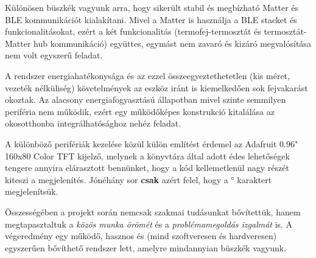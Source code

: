 \documentclass[12pt,a4paper]{article}
\begin{document}
Különösen büszkék vagyunk arra, hogy sikerült stabil és megbízható Matter és BLE kommunikációt kialakítani.
Mivel a Matter is használja a BLE stacket és funkcionalitásokat, ezért a két funkcionalitás (termofej-termosztát és termosztát-Matter hub kommunikáció) együttes, egymást nem
zavaró és kizáró megvalósítása nem volt egyszerű feladat.

A rendszer energiahatékonysága és az ezzel összeegyeztethetetlen (kis méret, vezeték nélküliség) követelmények az eszköz iránt is kiemelkedően sok fejvakarást okoztak.
Az alacsony energiafogyasztású állapotban mivel szinte semmilyen periféria nem működik, ezért egy működőképes konstrukció kitalálása az okosotthonba integrálhatósághoz 
nehéz feladat.

A különböző perifériák kezelése közül külön említést érdemel az Adafruit 0.96" 160x80 Color TFT kijelző, melynek a könyvtára által adott édes lehetőségek tengere annyira
elárasztott bennünket, hogy a kód kellemetlenül nagy részét kiteszi a megjelenítés. Jónéhány sor \textbf{csak} azért felel, hogy a ° karaktert megjelenítsük.

Összességében a projekt során nemcsak szakmai tudásunkat bővítettük, hanem megtapasztaltuk a \textit{közös munka örömét} és a \textit{problémamegoldás izgalmát} is.
A végeredmény egy működő, hasznos és (mind szoftveresen és hardveresen) egyszerűen bővíthető rendszer lett, amelyre mindannyian büszkék vagyunk.
\end{document}
